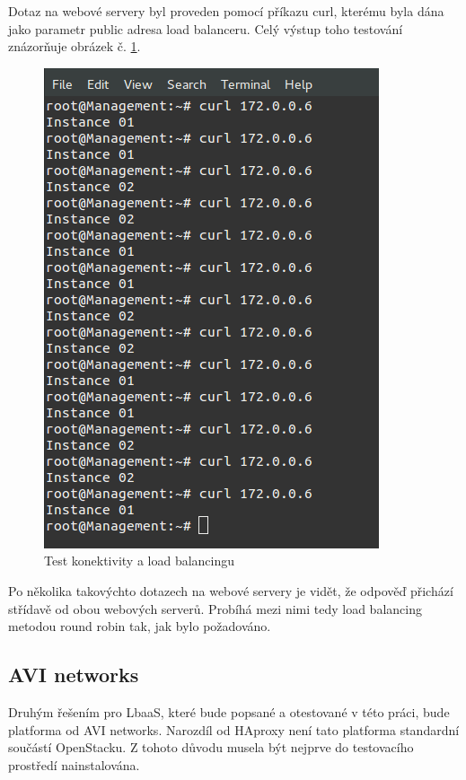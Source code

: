 Dotaz na webové servery byl proveden pomocí příkazu curl, kterému byla dána jako parametr public adresa load balanceru. Celý výstup toho testování znázorňuje obrázek č. \ref{fig:lbaas_testing}. 

\begin{figure}[h]
\begin{centering}
\includegraphics[scale=0.45]{images/lbaas_testing}
\par\end{centering}
\caption{Test konektivity a load balancingu\label{fig:lbaas_testing}}
\end{figure}

Po několika takovýchto dotazech na webové servery je vidět, že odpověď přichází střídavě od obou webových serverů. Probíhá mezi nimi tedy load balancing metodou round robin tak, jak bylo požadováno.

\subsection{AVI networks}

Druhým řešením pro LbaaS, které bude popsané a otestované v této práci, bude platforma od AVI networks. Narozdíl od HAproxy není tato platforma standardní součástí OpenStacku. Z tohoto důvodu musela být nejprve do testovacího prostředí nainstalována. 

